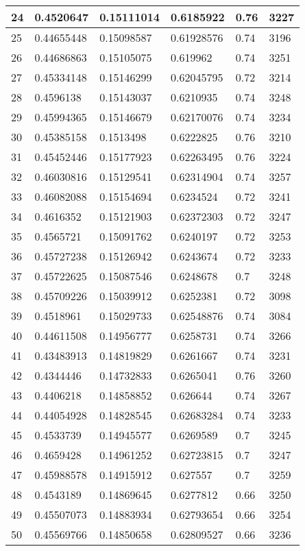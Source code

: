 \begin{longtable}{|l|l|l|l|l|l|}
24 & 0.4520647 & 0.15111014 & 0.6185922 & 0.76 & 3227 \\ \hline 
25 & 0.44655448 & 0.15098587 & 0.61928576 & 0.74 & 3196 \\ \hline 
26 & 0.44686863 & 0.15105075 & 0.619962 & 0.74 & 3251 \\ \hline 
27 & 0.45334148 & 0.15146299 & 0.62045795 & 0.72 & 3214 \\ \hline 
28 & 0.4596138 & 0.15143037 & 0.6210935 & 0.74 & 3248 \\ \hline 
29 & 0.45994365 & 0.15146679 & 0.62170076 & 0.74 & 3234 \\ \hline 
30 & 0.45385158 & 0.1513498 & 0.6222825 & 0.76 & 3210 \\ \hline 
31 & 0.45452446 & 0.15177923 & 0.62263495 & 0.76 & 3224 \\ \hline 
32 & 0.46030816 & 0.15129541 & 0.62314904 & 0.74 & 3257 \\ \hline 
33 & 0.46082088 & 0.15154694 & 0.6234524 & 0.72 & 3241 \\ \hline 
34 & 0.4616352 & 0.15121903 & 0.62372303 & 0.72 & 3247 \\ \hline 
35 & 0.4565721 & 0.15091762 & 0.6240197 & 0.72 & 3253 \\ \hline 
36 & 0.45727238 & 0.15126942 & 0.6243674 & 0.72 & 3233 \\ \hline 
37 & 0.45722625 & 0.15087546 & 0.6248678 & 0.7 & 3248 \\ \hline 
38 & 0.45709226 & 0.15039912 & 0.6252381 & 0.72 & 3098 \\ \hline 
39 & 0.4518961 & 0.15029733 & 0.62548876 & 0.74 & 3084 \\ \hline 
40 & 0.44611508 & 0.14956777 & 0.6258731 & 0.74 & 3266 \\ \hline 
41 & 0.43483913 & 0.14819829 & 0.6261667 & 0.74 & 3231 \\ \hline 
42 & 0.4344446 & 0.14732833 & 0.6265041 & 0.76 & 3260 \\ \hline 
43 & 0.4406218 & 0.14858852 & 0.626644 & 0.74 & 3267 \\ \hline 
44 & 0.44054928 & 0.14828545 & 0.62683284 & 0.74 & 3233 \\ \hline 
45 & 0.4533739 & 0.14945577 & 0.6269589 & 0.7 & 3245 \\ \hline 
46 & 0.4659428 & 0.14961252 & 0.62723815 & 0.7 & 3247 \\ \hline 
47 & 0.45988578 & 0.14915912 & 0.627557 & 0.7 & 3259 \\ \hline 
48 & 0.4543189 & 0.14869645 & 0.6277812 & 0.66 & 3250 \\ \hline 
49 & 0.45507073 & 0.14883934 & 0.62793654 & 0.66 & 3254 \\ \hline 
50 & 0.45569766 & 0.14850658 & 0.62809527 & 0.66 & 3236 \\ \hline 
\end{longtable}